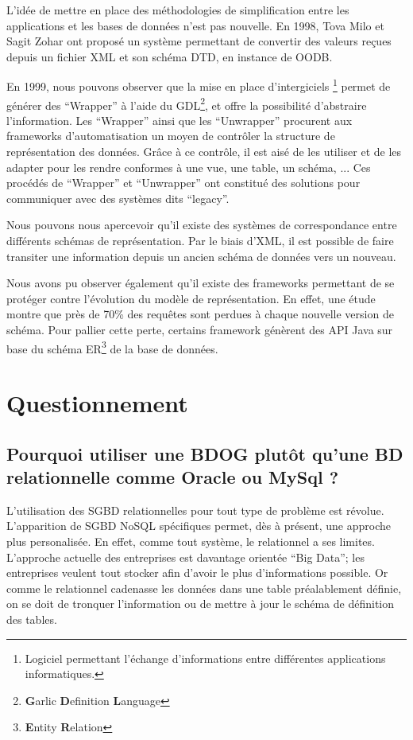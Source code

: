 \documentclass[a4paper,fleqn,12pt,oneside]{report}
\begin{document}
L'idée de mettre en place des méthodologies de simplification entre les applications et les bases de données n'est pas nouvelle. En 1998, Tova Milo et Sagit Zohar ont proposé un système permettant de convertir des valeurs reçues depuis un fichier XML et son schéma DTD, en instance de OODB\cite{milo1998using}. 

\label{frameworksAnalyse}
En 1999, nous pouvons observer que la mise en place d'intergiciels \footnote{Logiciel permettant l'échange d'informations entre différentes applications informatiques. } permet de générer des \enquote{Wrapper} à l'aide du GDL\footnote{\textbf{G}arlic \textbf{D}efinition \textbf{L}anguage}, et offre la possibilité d'abstraire l'information\cite{niswonger1999transforming}. Les \enquote{Wrapper} ainsi que les \enquote{Unwrapper} procurent aux frameworks d'automatisation un moyen de contrôler la structure de représentation des données. Grâce à ce contrôle, il est aisé de les utiliser et de les adapter pour les rendre conformes à une vue, une table, un schéma, ...  Ces procédés de \enquote{Wrapper} et \enquote{Unwrapper} ont constitué des solutions pour communiquer avec des systèmes dits \enquote{legacy}.

Nous pouvons nous apercevoir qu'il existe des systèmes de correspondance entre différents schémas de représentation. Par le biais d'XML, il est possible de faire transiter une information depuis un ancien schéma de données vers un nouveau\cite{miller2000schema}. 

Nous avons pu observer également qu'il existe des frameworks permettant de se protéger contre l'évolution du modèle de représentation. En effet, une étude montre que près de 70\% des requêtes\cite{curino2008schema} sont perdues à chaque nouvelle version de schéma. Pour pallier cette perte, certains framework génèrent des API Java sur base du schéma ER\footnote{\textbf{E}ntity \textbf{R}elation} de la base de données\cite{cleve2010conceptual}.

\section{Questionnement}

\subsection*{Pourquoi utiliser une BDOG plutôt qu'une BD relationnelle comme Oracle ou MySql ?}

L’utilisation des SGBD relationnelles pour tout type de problème est révolue. L'apparition de SGBD NoSQL spécifiques permet, dès à présent, une approche plus personalisée. En effet, comme tout système, le relationnel a ses limites. L’approche actuelle des entreprises est davantage orientée \enquote{Big Data}; les entreprises veulent tout stocker afin d’avoir le plus d’informations possible\cite{lohr2012age}. Or comme le relationnel cadenasse les données dans une table préalablement définie, on se doit de tronquer l’information ou de mettre à jour le schéma de définition des tables. 
\end{document}
